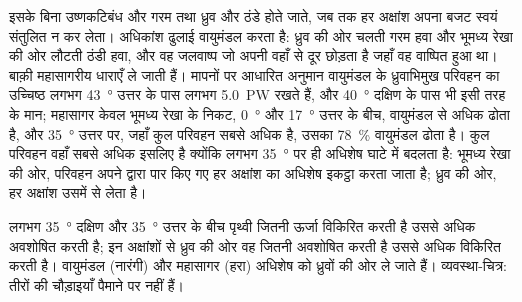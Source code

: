 इसके बिना उष्णकटिबंध और गरम तथा ध्रुव और ठंडे होते जाते, जब तक हर अक्षांश अपना बजट
स्वयं संतुलित न कर लेता। अधिकांश ढुलाई वायुमंडल करता है:
ध्रुव की ओर चलती गरम हवा और भूमध्य रेखा की ओर लौटती ठंडी हवा, और वह
जलवाष्प जो अपनी  वहाँ से दूर छोड़ता है जहाँ वह वाष्पित हुआ था। बाक़ी
महासागरीय धाराएँ ले जाती हैं। मापनों पर आधारित अनुमान वायुमंडल के ध्रुवाभिमुख परिवहन का
उच्चिष्ठ लगभग \qty{43}{\degree} उत्तर के पास लगभग \qty{5.0}{PW} रखते हैं, और
\qty{40}{\degree} दक्षिण के पास भी इसी तरह के मान; महासागर
केवल भूमध्य रेखा के निकट, \qty{0}{\degree} और \qty{17}{\degree} उत्तर के बीच, वायुमंडल
से अधिक ढोता है, और \qty{35}{\degree} उत्तर पर, जहाँ
कुल परिवहन सबसे अधिक है, उसका \qty{78}{\percent} वायुमंडल ढोता
है। कुल परिवहन वहाँ सबसे अधिक इसलिए है क्योंकि लगभग \qty{35}{\degree} पर ही
अधिशेष घाटे में बदलता है: भूमध्य रेखा की ओर, परिवहन अपने द्वारा पार किए गए हर अक्षांश का
अधिशेष इकट्ठा करता जाता है; ध्रुव की ओर, हर अक्षांश उसमें से
लेता है।

\begin{omfigure}

{\small लगभग \qty{35}{\degree} दक्षिण और \qty{35}{\degree} उत्तर के बीच पृथ्वी
जितनी ऊर्जा विकिरित करती है उससे अधिक अवशोषित करती है; इन अक्षांशों से ध्रुव की ओर वह
जितनी अवशोषित करती है उससे अधिक विकिरित करती है। वायुमंडल (नारंगी) और महासागर (हरा)
अधिशेष को ध्रुवों की ओर ले जाते हैं। व्यवस्था-चित्र: तीरों की चौड़ाइयाँ
पैमाने पर नहीं हैं।}
\end{omfigure}


